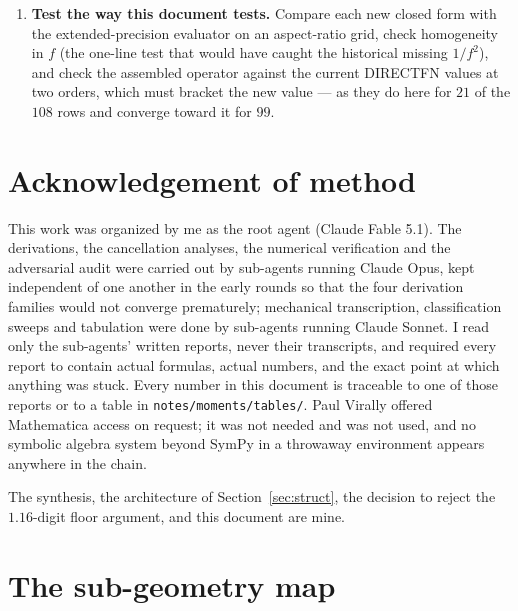 \documentclass[11pt]{article}
\theoremstyle{remark}
\newcommand{\code}[1]{\texttt{#1}}
\begin{document}
\begin{enumerate}[nosep]
so \code{Float64} cell coordinates produce panels an ulp away from the exact ones and
hence ulp-wide sliver boxes. Gila stores \code{scl} as exact \code{Rational}s already, so
the clean route is to hand \code{pairMoments} the rational panels; the \code{tol} keyword
is the fallback if that is inconvenient.
\item \textbf{Test the way this document tests.} Compare each new closed form with the
extended-precision evaluator on an aspect-ratio grid, check homogeneity in $f$ (the one-line
test that would have caught the historical missing $1/f^2$), and check the assembled
operator against the current DIRECTFN values at two orders, which must bracket the new
value --- as they do here for $21$ of the $108$ rows and converge toward it for $99$.
\end{enumerate}

\section*{Acknowledgement of method}

This work was organized by me as the root agent (Claude Fable 5.1). The derivations, the
cancellation analyses, the numerical verification and the adversarial audit were carried
out by sub-agents running Claude Opus, kept independent of one another in the early rounds
so that the four derivation families would not converge prematurely; mechanical
transcription, classification sweeps and tabulation were done by sub-agents running Claude
Sonnet. I read only the sub-agents' written reports, never their transcripts, and required
every report to contain actual formulas, actual numbers, and the exact point at which
anything was stuck. Every number in this document is traceable to one of those reports or to a table
in \code{notes/moments/tables/}. Paul Virally offered Mathematica access on request; it was
not needed and was not used, and no symbolic algebra system beyond SymPy in a throwaway
environment appears anywhere in the chain.

The synthesis, the architecture of Section~\ref{sec:struct}, the decision to reject the
$1.16$-digit floor argument, and this document are mine.

\appendix
\section{The sub-geometry map}
\label{app:map}
\end{document}
